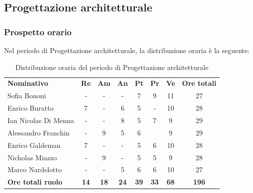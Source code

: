 \documentclass[../piano-di-progetto.tex]{subfiles}
\begin{document}
  \subsection{Progettazione architetturale}

  \subsubsection{Prospetto orario}
  Nel periodo di Progettazione architetturale, la distribuzione oraria è la seguente:
  \begin{table}[H]
    \centering
    \begin{tabular}{lccccccc}
      \rowcolor{lightgray}
      \textbf{Nominativo}        & \textbf{Re} & \textbf{Am}  & \textbf{An} & \textbf{Pt}  & \textbf{Pr}   & \textbf{Ve} & \textbf{Ore totali} \\
      Sofia Bononi              & -           & -           & -           & 7           & 9           & 11          & 27           \\
      Enrico Buratto            & 7           & -           & 6           & 5           & -           & 10          & 28           \\
      Ian Nicolas Di Menna      & -           & -           & 8           & 5           & 7           & 9           & 29           \\
      Alessandro Franchin       & -           & 9           & 5           & 6           &             & 9           & 29           \\
      Enrico Galdeman           & 7           & -           & -           & 5           & 6           & 10          & 28           \\
      Nicholas Miazzo           & -           & 9           & -           & 5           & 5           & 9           & 28           \\
      Marco Nardelotto          & -           & -           & 5           & 6           & 6           & 10          & 27           \\
      \textbf{Ore totali ruolo} & \textbf{14} & \textbf{18} & \textbf{24} & \textbf{39} & \textbf{33} & \textbf{68} & \textbf{196}
    \end{tabular}
    \caption{Distribuzione oraria del periodo di Progettazione architetturale}
  \end{table}
\end{document}
